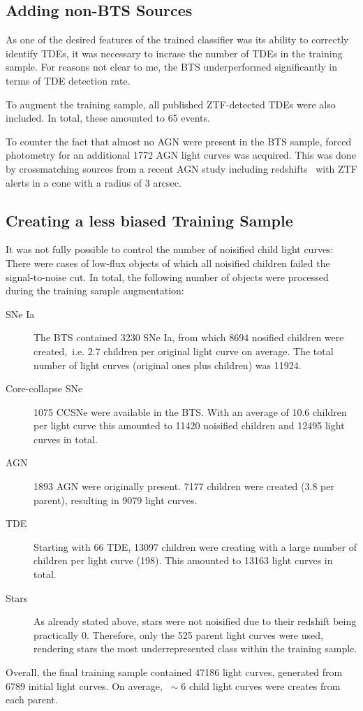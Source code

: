 \subsection{Adding non-BTS Sources}\label{addsources}
As one of the desired features of the trained classifier was its ability to correctly identify TDEs, it was necessary to incrase the number of TDEs in the training sample. For reasons not clear to me, the BTS underperformed significantly in terms of TDE detection rate.

To augment the training sample, all published ZTF-detected TDEs were also included. In total, these amounted to 65 events.

To counter the fact that almost no AGN were present in the BTS sample, forced photometry for an additional 1772 AGN light curves was acquired. This was done by crossmatching sources from a recent AGN study including redshifts~ with ZTF alerts in a cone with a radius of 3 arcsec.

\subsection{Creating a less biased Training Sample}
It was not fully possible to control the number of noisified child light curves: There were cases of low-flux objects of which all noisified children failed the signal-to-noise cut. In total, the following number of objects were processed during the training sample augmentation:
\begin{description}
  \item[SNe Ia] The BTS contained 3230 SNe Ia, from which 8694 nosified children were created,~i.e. 2.7 children per original light curve on average. The total number of light curves (original ones plus children) was 11924.
  \item[Core-collapse SNe] 1075 CCSNe were available in the BTS. With an average of 10.6 children per light curve this amounted to 11420 noisified children and 12495 light curves in total.
  \item[AGN] 1893 AGN were originally present. 7177 children were created (3.8 per parent), resulting in 9079 light curves.
  \item[TDE] Starting with 66 TDE, 13097 children were creating with a large number of children per light curve (198). This amounted to 13163 light curves in total.
  \item[Stars] As already stated above, stars were not noisified due to their redshift being practically 0. Therefore, only the 525 parent light curves were used, rendering stars the most underrepresented class within the training sample.
\end{description}
Overall, the final training sample contained 47186 light curves, generated from 6789 initial light curves. On average, $~\sim 6$ child light curves were creates from each parent.


